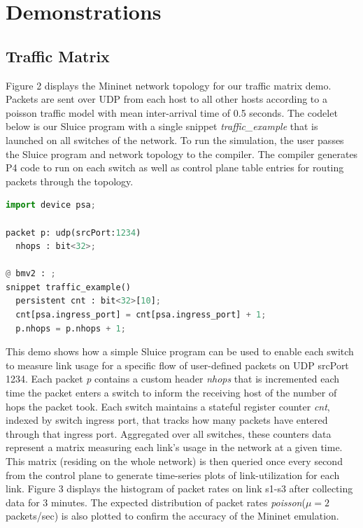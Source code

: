 

\section{Demonstrations}
 
\subsection{Traffic Matrix}

Figure 2 displays the Mininet network topology for our traffic matrix demo.
Packets are sent over UDP from each host to all other hosts according to a
poisson traffic model with mean inter-arrival time of 0.5 seconds. The codelet
below is our Sluice program with a single snippet \textit{traffic\_example}
that is launched on all switches of the network. To run the simulation, the
user passes the Sluice program and network topology to the compiler. The
compiler generates P4 code to run on each switch as well as control plane table
entries for routing packets through the topology.

\begin{lstlisting}[language=Python, basicstyle=\scriptsize]
import device psa;

packet p: udp(srcPort:1234)
  nhops : bit<32>;

@ bmv2 : ;
snippet traffic_example()
  persistent cnt : bit<32>[10];
  cnt[psa.ingress_port] = cnt[psa.ingress_port] + 1;
  p.nhops = p.nhops + 1;
\end{lstlisting}

This demo shows how a simple Sluice program can be used to enable each switch
to measure link usage for a specific flow of user-defined packets on UDP
srcPort 1234. Each packet \textit{p} contains a custom header \textit{nhops}
that is incremented each time the packet enters a switch to inform the
receiving host of the number of hops the packet took. Each switch maintains a
stateful register counter \textit{cnt}, indexed by switch ingress port, that
tracks how many packets have entered through that ingress port. Aggregated over
all switches, these counters data represent a matrix measuring each link's
usage in the network at a given time. This matrix (residing on the whole
network) is then queried once every second from the control plane to generate
time-series plots of link-utilization for each link. Figure 3 displays the
histogram of packet rates on link s1-s3 after collecting data for 3 minutes.
The expected distribution of packet rates \textit{poisson}($\mu = 2$
packets/sec) is also plotted to confirm the accuracy of the Mininet emulation.

